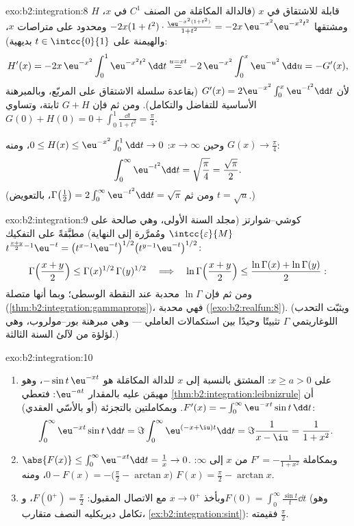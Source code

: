 \begin{solution}{exo:b2:integration:8}
$H$ قابلة للاشتقاق في $x$ (فالدالة المكامَلة من الصنف $C^1$ في $x$، ومشتقها
$-2x(1+t^2)\cdot\frac{\eu^{-x^2(1+t^2)}}{1+t^2} =
-2x\,\eu^{-x^2}\eu^{-x^2t^2}$  ومحدود على متراصات
$x$، والهيمنة على $t \in \intcc{0}{1}$ بديهية):
\[
H'(x) = -2x\,\eu^{-x^2}\int_0^1 \eu^{-x^2t^2}\,\dd t
\overset{u = xt}{=} -2\,\eu^{-x^2}\int_0^x \eu^{-u^2}\,\dd u
= -G'(x),
\]
لأن $G'(x) = 2\eu^{-x^2}\int_0^x \eu^{-t^2}\dd t$ (بقاعدة سلسلة الاشتقاق على
المربّع، وبالمبرهنة الأساسية للتفاضل والتكامل). ومن ثم فإن $G + H$
ثابتة، وتساوي $G(0) + H(0) = 0 + \int_0^1 \frac{\dd t}{1+t^2}
= \frac\pi4$.

وحين $x \to \infty$: $0 \leq H(x) \leq \eu^{-x^2}\int_0^1 \dd t \to
0$، ومنه $G(x) \to \frac\pi4$:
\[
\int_0^\infty \eu^{-t^2}\dd t = \sqrt{\frac\pi4} =
\frac{\sqrt\pi}{2} .
\]
(ومن ثم $\Gamma\bigl(\frac12\bigr) = 2\int_0^\infty
\eu^{-t^2}\dd t = \sqrt\pi$، بالتعويض $t = \sqrt u$.)
\end{solution}

\begin{solution}{exo:b2:integration:9}
كوشي--شوارتز (مجلد السنة الأولى، وهي صالحة على $\intcc{\varepsilon}{M}$
ومُمرَّرة إلى النهاية) مطبَّقةً على التفكيك
$t^{\frac{x+y}{2}-1}\eu^{-t} = \bigl(t^{x-1}\eu^{-t}\bigr)^{1/2}
\bigl(t^{y-1}\eu^{-t}\bigr)^{1/2}$:
\[
\Gamma\Bigl(\frac{x+y}{2}\Bigr) \leq
\Gamma(x)^{1/2}\,\Gamma(y)^{1/2}
\quad\Longrightarrow\quad
\ln\Gamma\Bigl(\frac{x+y}{2}\Bigr) \leq \frac{\ln\Gamma(x) +
\ln\Gamma(y)}{2} :
\]
ومن ثم فإن $\ln\Gamma$ محدبة عند النقطة الوسطى؛ وبما أنها متصلة
(\cref{thm:b2:integration:gammaprops})، فهي محدبة
(\cref{exo:b2:realfun:8}). (ويثبّت التحدب اللوغاريتمي $\Gamma$
تثبيتًا وحيدًا بين استكمالات العاملي --- وهي
مبرهنة بور--مولروب، وهي لؤلؤة من لآلئ السنة الثالثة.)
\end{solution}

\begin{solution}{exo:b2:integration:10}
\begin{enumerate}
  \item على $x \geq a > 0$: المشتق بالنسبة إلى $x$ للدالة المكامَلة هو
        $-\sin t\,\eu^{-xt}$، وهو مهيمَن عليه بالمقدار $\eu^{-at}$:
        فتعطي \cref{thm:b2:integration:leibnizrule} أن $F'(x) =
        -\int_0^\infty \eu^{-xt}\sin t\,\dd t$. وبمكاملتين
        بالتجزئة (أو بالأسّي العقدي):
        \[
        \int_0^\infty \eu^{-xt}\sin t\,\dd t
        = \Im \int_0^\infty \eu^{(-x+\iu)t}\dd t
        = \Im\frac{1}{x - \iu} = \frac{1}{1 + x^2} .
        \]
  \item $\abs{F(x)} \leq \int_0^\infty \eu^{-xt}\dd t = \frac1x \to
        0$. وبمكاملة $F' = -\frac{1}{1+x^2}$ من $x$ إلى
        $\infty$: $0 - F(x) = -\bigl(\frac\pi2 - \arctan x\bigr)$،
        ومنه $F(x) = \frac\pi2 - \arctan x$.
  \item وبأخذ $x \to 0^+$ مع الاتصال المقبول: $F(0^+) =
        \frac\pi2$، و$F(0) = \int_0^\infty \frac{\sin t}{t}\dd
        t$ (وهو تكامل ديريكليه النصف متقارب،
        \cref{ex:b2:integration:sint}): فقيمته
        $\frac\pi2$.
\end{enumerate}
\end{solution}

